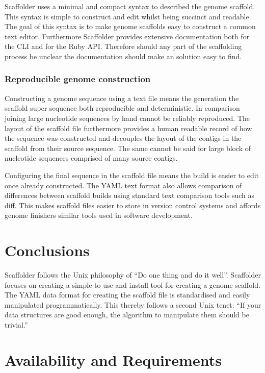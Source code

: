 \documentclass[10pt]{bmc_article}
\newenvironment{bmcformat}{\begin{raggedright}\baselineskip20pt\sloppy\setboolean{publ}{false}}{\end{raggedright}\baselineskip20pt\sloppy}
\begin{document}
\begin{bmcformat}
Scaffolder uses a minimal and compact syntax to described the genome scaffold.
This syntax is simple to construct and edit whilst being succinct and
readable. The goal of this syntax is to make genome scaffolds easy to
construct a common text editor. Furthermore Scaffolder provides extensive
documentation both for the CLI and for the Ruby API. Therefore should any part
of the scaffolding process be unclear the documentation should make an
solution easy to find. \pb

\subsubsection*{Reproducible genome construction} %

Constructing a genome sequence using a text file means the generation the
scaffold super sequence both reproducible and deterministic. In comparison
joining large nucleotide sequences by hand cannot be reliably reproduced. The
layout of the scaffold file furthermore provides a human readable record of
how the sequence was constructed and decouples the layout of the contigs in
the scaffold from their source sequence. The same cannot be said for large
block of nucleotide sequences comprised of many source contigs. \pb

Configuring the final sequence in the scaffold file means the build is easier
to edit once already constructed. The YAML text format also allows comparison
of differences between scaffold builds using standard text comparison tools
such as diff. This makes scaffold files easier to store in version control
systems and affords genome finishers similar tools used in software
development. \pb 

\clearpage

\section*{Conclusions} %

Scaffolder follows the Unix philosophy of ``Do one thing and do it well''.
Scaffolder focuses on creating a simple to use and install tool for creating
a genome scaffold. The YAML data format for creating the scaffold file is
standardised and easily manipulated programmatically. This thereby follows
a second Unix tenet: ``If your data structures are good enough, the algorithm
to manipulate them should be trivial.''

\clearpage

\section*{Availability and Requirements} %


\end{bmcformat}
\end{document}
